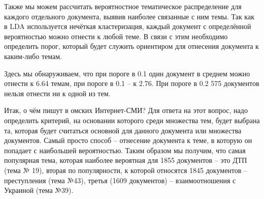 Также мы можем рассчитать вероятностное тематическое распределение для каждого отдельного документа, выявив наиболее связанные с ним темы. Так как в LDA используется нечёткая кластеризация, каждый документ с определённой вероятностью можно отнести к любой теме. В связи с этим необходимо определить порог, который будет служить ориентиром для отнесения документа к каким-либо темам.

Здесь мы обнаруживаем, что при пороге в 0.1 один документ в среднем можно отнести к 6.64 темам, при пороге в 0.1 -- к 2.76. При пороге в 0.2 575 документов нельзя отнести ни к одной из тем.

Итак, о чём пишут в омских Интернет-СМИ? Для ответа на этот вопрос, надо определить критерий, на основании которого среди множества тем, будет выбрана та, которая будет считаться основной для данного документа или множества документов. Самый просто способ -- отнесение документа к теме, в которую он попадает с наибольшей вероятностью. Таким образом мы получим, что самая популярная тема, которая наиболее вероятная для 1855 документов -- это ДТП (тема № 19), вторая по популярности, к которой относятся 1845 документов -- преступления (тема №43), третья (1609 документов) -- взаимоотношения с Украиной (тема №39). 

